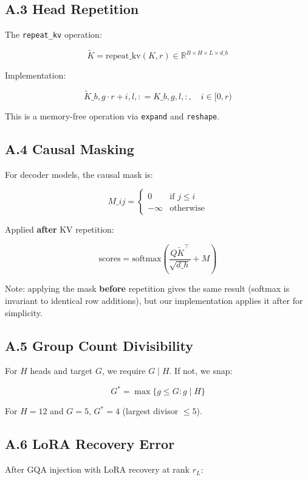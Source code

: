 \subsection{A.3 Head Repetition}

The \texttt{repeat\_kv} operation:

\[
\tilde{K} = \text{repeat\_kv}(K, r) \in \mathbb{R}^{B \times H \times L \times d\_h}
\tag{A.9}
\]

Implementation:

\[
\tilde{K}\_{b, g \cdot r + i, l, :} = K\_{b, g, l, :}, \quad i \in [0, r)
\tag{A.10}
\]

This is a memory-free operation via \texttt{expand} and \texttt{reshape}.

\subsection{A.4 Causal Masking}

For decoder models, the causal mask is:

\[
M\_{ij} = \begin{cases} 0 & \text{if } j \le i \\ -\infty & \text{otherwise} \end{cases}
\tag{A.11}
\]

Applied \textbf{after} KV repetition:

\[
\text{scores} = \text{softmax}\!\left(\frac{Q \tilde{K}^\top}{\sqrt{d\_h}} + M\right)
\tag{A.12}
\]

Note: applying the mask \textbf{before} repetition gives the same result 
(softmax is invariant to identical row additions), but our implementation 
applies it after for simplicity.

\subsection{A.5 Group Count Divisibility}

For $H$ heads and target $G$, we require $G \mid H$. If not, we snap:

\[
G^* = \max\{g \le G : g \mid H\}
\tag{A.13}
\]

For $H = 12$ and $G = 5$, $G^* = 4$ (largest divisor $\le 5$).

\subsection{A.6 LoRA Recovery Error}

After GQA injection with LoRA recovery at rank $r_L$:

